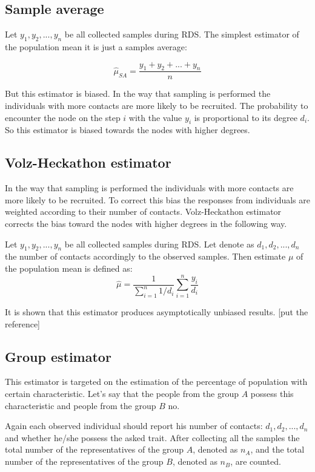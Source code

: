 \documentclass[12pt]{report}
\begin{document}
\subsection{Sample average}

Let $y_1, y_2, ..., y_n$ be all collected samples during RDS. The simplest estimator of the population mean it is just a samples average:

$$ \widehat{\mu}_{SA} = \frac{y_1 + y_2 + ... + y_n}{n}$$

But this estimator is biased. In the way that sampling is performed the individuals with more contacts are more likely to be recruited. The probability to encounter the node on the step $i$ with the value $y_i$ is proportional to its degree $d_i$.
So this estimator is biased towards the nodes with higher degrees.

 
\subsection{Volz-Heckathon estimator}

In the way that sampling is performed the individuals with more contacts are more likely to be recruited. To correct this bias the responses from individuals are weighted according to their number of contacts. Volz-Heckathon estimator corrects the bias toward the nodes with higher degrees in the following way.

Let $y_1, y_2, ..., y_n$ be all collected samples during RDS. Let denote as $d_1, d_2, ..., d_n$ the number of contacts accordingly to the observed samples.
Then estimate $\mu$ of the population mean is defined as:
$$ \hat{\mu} = \frac{1}{\sum\limits_{i=1}^n 1/d_i} \sum\limits_{i=1}^n \frac{y_i}{d_i}$$

It is shown that this estimator produces asymptotically unbiased results. [put the reference]

\subsection{Group estimator}

This estimator is targeted on the estimation of the percentage of population with certain characteristic. Let's say that the people from the group $A$ possess this characteristic and people from the group $B$ no. 

Again each observed individual should report his number of contacts: $d_1, d_2, ..., d_n$ and whether he/she possess the asked trait. After collecting all the samples the total number of the representatives of the group $A$, denoted as $n_A$, and the total number of the representatives of the group $B$, denoted as $n_B$, are counted. 
\end{document}
